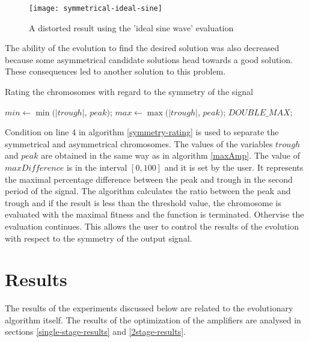 \begin{figure}[H]
    \centerline{\texttt{[image: symmetrical-ideal-sine]}\label{symmetrical-ideal-sine}}
    \caption{A distorted result using the 'ideal sine wave' evaluation}
\end{figure}

The ability of the evolution to find the desired solution was also decreased because some asymmetrical candidate solutions head towards a good solution. These consequences led to another solution to this problem.

\begin{algorithm}
\caption{Rating the chromosomes with regard to the symmetry of the signal}
\label{symmetry-rating}
\begin{algorithmic}[1]
    \State $min \gets \min(|trough|$, $peak)$;
    \State $max \gets \max(|trough|$, $peak)$;
        \State \Return $DOUBLE\_MAX$;
    \EndIf
    \EndFunction
\end{algorithmic}
\end{algorithm}

Condition on line 4 in algorithm \ref{symmetry-rating} is used to separate the symmetrical and asymmetrical chromosomes. The values of the variables $trough$ and $peak$ are obtained in the same way as in algorithm \ref{maxAmp}. The value of $maxDifference$ is in the interval $\left[0, 100\right]$ and it is set by the user. It represents the maximal percentage difference between the peak and trough in the second period of the signal. The algorithm calculates the ratio between the peak and trough and if the result is less than the threshold value, the chromosome is evaluated with the maximal fitness and the function is terminated. Othervise the evaluation continues. This allows the user to control the results of the evolution with respect to the symmetry of the output signal.

\section{Results}
The results of the experiments discussed below are related to the evolutionary algorithm itself. The results of the optimization of the amplifiers are analysed in sections \ref{single-stage-results} and \ref{2stage-results}.

